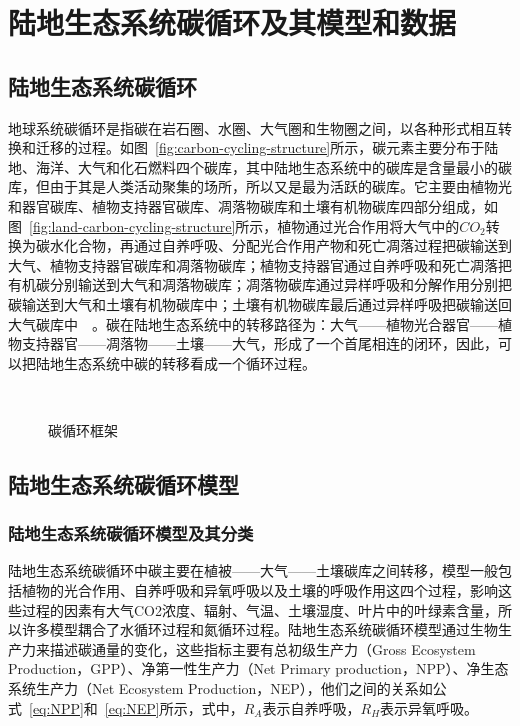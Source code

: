 \chapter{陆地生态系统碳循环及其模型和数据}
\label{chap:model}

\section{陆地生态系统碳循环}
地球系统碳循环是指碳在岩石圈、水圈、大气圈和生物圈之间，以各种形式相互转换和迁移的过程。如图~\ref{fig:carbon-cycling-structure}所示，碳元素主要分布于陆地、海洋、大气和化石燃料四个碳库，其中陆地生态系统中的碳库是含量最小的碳库，但由于其是人类活动聚集的场所，所以又是最为活跃的碳库。它主要由植物光和器官碳库、植物支持器官碳库、凋落物碳库和土壤有机物碳库四部分组成，如图~\ref{fig:land-carbon-cycling-structure}所示，植物通过光合作用将大气中的$CO_2$转换为碳水化合物，再通过自养呼吸、分配光合作用产物和死亡凋落过程把碳输送到大气、植物支持器官碳库和凋落物碳库；植物支持器官通过自养呼吸和死亡凋落把有机碳分别输送到大气和凋落物碳库；凋落物碳库通过异样呼吸和分解作用分别把碳输送到大气和土壤有机物碳库中；土壤有机物碳库最后通过异样呼吸把碳输送回大气碳库中~\cite{2004地球系统碳循环}~\cite{毛留喜2006陆地生态系统碳循环模型研究概述}。碳在陆地生态系统中的转移路径为：大气——植物光合器官——植物支持器官——凋落物——土壤——大气，形成了一个首尾相连的闭环，因此，可以把陆地生态系统中碳的转移看成一个循环过程。

\begin{figure}[!htbp]
    \centering
    \hfill
     \\
    \caption{碳循环框架}
    \label{fig:carbon-cycling}
\end{figure}

\section{陆地生态系统碳循环模型}
\label{sec:model}
\subsection{陆地生态系统碳循环模型及其分类}
陆地生态系统碳循环中碳主要在植被——大气——土壤碳库之间转移，模型一般包括植物的光合作用、自养呼吸和异氧呼吸以及土壤的呼吸作用这四个过程，影响这些过程的因素有大气CO2浓度、辐射、气温、土壤湿度、叶片中的叶绿素含量，所以许多模型耦合了水循环过程和氮循环过程。陆地生态系统碳循环模型通过生物生产力来描述碳通量的变化，这些指标主要有总初级生产力（Gross Ecosystem Production，GPP）、净第一性生产力（Net Primary production，NPP）、净生态系统生产力（Net Ecosystem Production，NEP），他们之间的关系如公式~\ref{eq:NPP}和~\ref{eq:NEP}所示，式中，$R_A$表示自养呼吸，$R_H$表示异氧呼吸。

